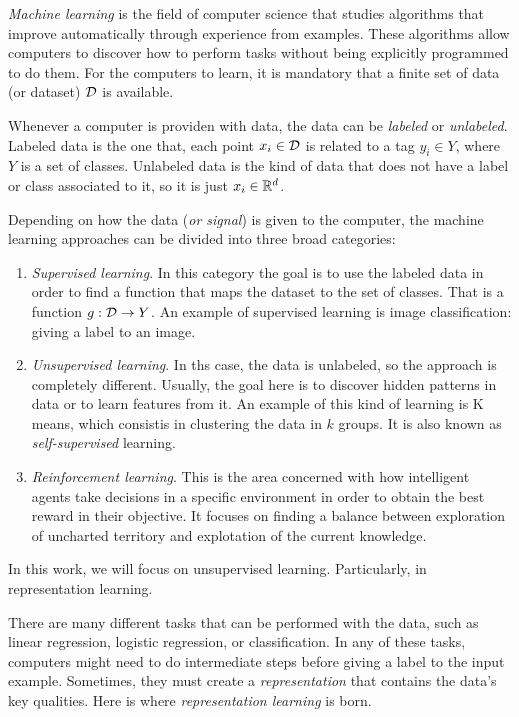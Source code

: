\label{Chapter:Intro:Rep:Learning}

\emph{Machine learning} is the field of computer science that studies algorithms that improve automatically through experience from examples. 
These algorithms allow computers to discover how to
perform tasks without being explicitly programmed to do them. For the computers to learn, it is mandatory that a finite set of data (or dataset) $\mathcal{D}$ is available. 

Whenever a computer is providen with data, the data can be \emph{labeled} or \emph{unlabeled}. Labeled data is the one that, each point $x_i \in \mathcal{D}$ is related to a tag $y_i \in Y$, where $Y$ is a set of classes.
Unlabeled data is the kind of data that does not have a label or class associated to it, so it is just $x_i \in \mathbb{R}^d$. 

Depending on how the data (\emph{or signal}) is given to the computer, the machine learning approaches can be divided into three broad categories:
\begin{enumerate}
    \item \emph{Supervised learning}. In this category the goal is to use the labeled data in order to find a function that maps the dataset to the set of classes. That is a function $g:\mathcal{D} \to Y$. 
    An example of supervised learning is image classification: giving a label to an image.
    \item \emph{Unsupervised learning}. In ths case, the data is unlabeled, so the approach is completely different. Usually, the goal here is to discover hidden patterns in data or to learn features from it.
    An example of this kind of learning is K means, which consistis in clustering the data in $k$ groups. It is also known as \emph{self-supervised} learning.
    \item \emph{Reinforcement learning}. This is the area concerned with how intelligent agents take decisions in a specific environment in order to obtain the best reward in their objective. It focuses on finding a balance between exploration of uncharted territory and explotation of the current knowledge.

\end{enumerate}

In this work, we will focus on unsupervised learning. Particularly, in representation learning.

There are many different tasks that can be performed with the data, such as linear regression, logistic regression, or classification. In any of these tasks, computers might need
to do intermediate steps before giving a label to the input example. Sometimes, they must create a \emph{representation} that 
contains the data's key qualities.  Here is where \emph{representation learning} is born. 


